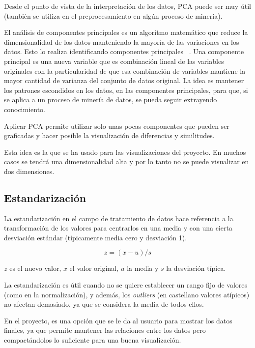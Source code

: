 Desde el punto de vista de la interpretación de los datos, PCA puede ser muy
útil (también se utiliza en el preprocesamiento en algún proceso de minería).

El análisis de componentes principales es un algoritmo matemático que reduce la
dimensionalidad de los datos manteniendo la mayoría de las variaciones en los
datos. Esto lo realiza identificando componentes principales~
\cite{ringner2008principal}. Una componente principal es una nueva variable que
es combinación lineal de las variables originales con la particularidad de que
esa combinación de variables mantiene la mayor cantidad de varianza del conjunto
de datos original. La idea es mantener los patrones escondidos en los datos, en
las componentes principales, para que, si se aplica a un proceso de minería de
datos, se pueda seguir extrayendo conocimiento.

Aplicar PCA permite utilizar solo unas pocas componentes que pueden ser
graficadas y hacer posible la visualización de diferencias y similitudes.

Esta idea es la que se ha usado para las visualizaciones del proyecto. En muchos
casos se tendrá una dimensionalidad alta y por lo tanto no se puede visualizar
en dos dimensiones.

\subsection{Estandarización}

La estandarización en el campo de tratamiento de datos hace referencia a la
transformación de los valores para centrarlos en una media y con una cierta
desviación estándar (típicamente media cero y desviación 1).

\begin{equation}
  z = (x - u) / s
\end{equation}

\noindent $z$ es el nuevo valor, $x$ el valor original, $u$ la media y $s$ la
desviación típica.

La estandarización es útil cuando no se quiere establecer un rango fijo  de
valores (como en la normalización), y además, los \textit{outliers} (en
castellano valores atípicos) no afectan demasiado, ya que se considera la media
de todos ellos.

En el proyecto, es una opción que se le da al usuario para mostrar los datos
finales, ya que permite mantener las relaciones entre los datos pero
compactándolos lo suficiente para una buena visualización.

